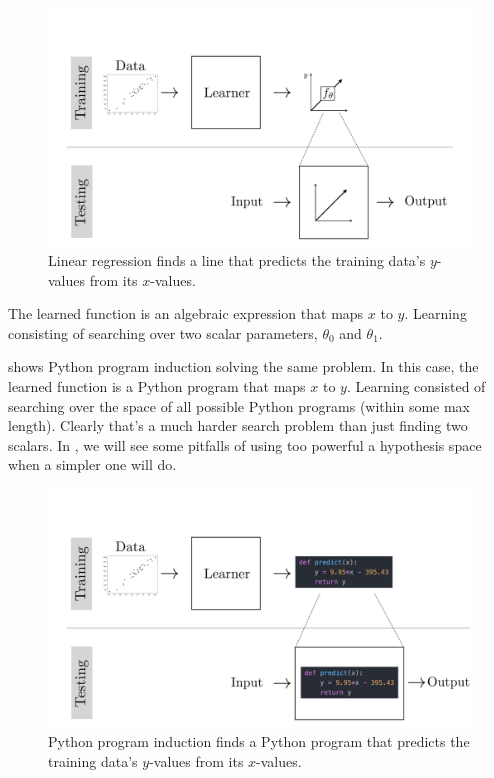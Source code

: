 \begin{figure}[h]
    \centerline{
        \includegraphics[width=0.8\linewidth]{./figures/intro_to_learning/ols_system_diagram.pdf}
    }
    \caption{Linear regression finds a line that predicts the training data's $y$-values from its $x$-values.}
    \label{fig:intro_to_learning:ols_system_diagram}
\end{figure}

The learned function is an algebraic expression that maps $x$ to $y$. Learning consisting of searching over two scalar parameters, $\theta_0$ and $\theta_1$.

\Fig{\ref{fig:intro_to_learning:program_induction_system_diagram}} shows Python program induction solving the same problem. In this case, the learned function is a Python program that maps $x$ to $y$. Learning consisted of searching over the space of all possible Python programs (within some max length). Clearly that's a much harder search problem than just finding two scalars. In \chap{\ref{chapter:problem_of_generalization}}, we will see some pitfalls of using too powerful a hypothesis space when a simpler one will do.

\begin{figure}[h]
    \centerline{
        \includegraphics[width=0.8\linewidth]{./figures/intro_to_learning/program_induction_system_diagram.pdf}
    }
    \caption{Python program induction finds a Python program that predicts the training data's $y$-values from its $x$-values.}
    \label{fig:intro_to_learning:program_induction_system_diagram}
\end{figure}

